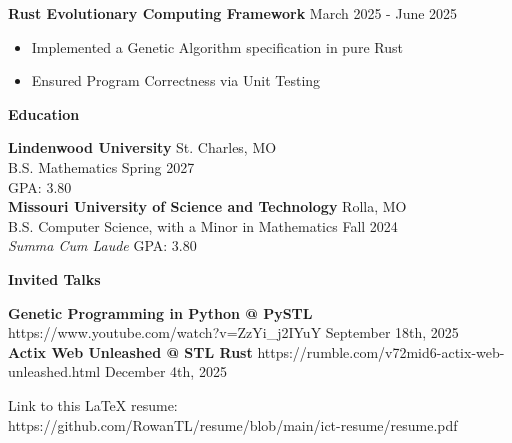\documentclass[11pt]{article}
\begin{document}
\textbf{Rust Evolutionary Computing Framework} \hfill March 2025 - June 2025
\begin{itemize}[noitemsep, topsep=0pt, partopsep=0pt, parsep=0pt, itemsep=0pt]
    \item Implemented a Genetic Algorithm specification in pure Rust
    \item Ensured Program Correctness via Unit Testing
\end{itemize}

\begin{center}
    \textbf{Education}
\end{center}
\textbf{Lindenwood University} \hfill St. Charles, MO \\
B.S. Mathematics \hfill Spring 2027 \\
\phantom{This moves GPA to the right. Hi if you see this!} %
\hfill GPA: 3.80\\

\textbf{Missouri University of Science and Technology} \hfill Rolla, MO \\
B.S. Computer Science, with a Minor in Mathematics \hfill Fall 2024  \\
\textit{Summa Cum Laude} \hfill GPA: 3.80

\begin{center}
    \textbf{Invited Talks}
\end{center}

\textbf{Genetic Programming in Python @ PySTL} \tiny{https://www.youtube.com/watch?v=ZzYi\_j2IYuY} \hfill \normalsize{September 18th, 2025} \\
\textbf{Actix Web Unleashed @ STL Rust} \tiny{https://rumble.com/v72mid6-actix-web-unleashed.html} \hfill \normalsize{December 4th, 2025}

\begin{center}
    \tiny{Link to this LaTeX resume: https://github.com/RowanTL/resume/blob/main/ict-resume/resume.pdf}
\end{center}
\end{document}
